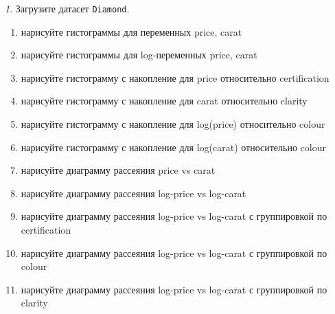 \documentclass[12pt]{article}
\theoremstyle{remark}
\newtheorem{exercise}{}[section]
\begin{document}
\begin{exercise}
Загрузите датасет \texttt{Diamond}.
\begin{enumerate}
	\item нарисуйте гистограммы для переменных price, carat
	\item нарисуйте гистограммы для log-переменных price, carat
	\item нарисуйте гистограмму с накопление для price относительно certification
	\item нарисуйте гистограмму с накопление для carat относительно clarity 
	\item нарисуйте гистограмму с накопление для log(price) относительно colour
	\item нарисуйте гистограмму с накопление для log(carat) относительно colour
	\item нарисуйте диаграмму рассеяния price vs carat
	\item нарисуйте диаграмму рассеяния log-price vs log-carat
	\item нарисуйте диаграмму рассеяния log-price vs log-carat с группировкой по certification
	\item нарисуйте диаграмму рассеяния log-price vs log-carat с группировкой по colour
	\item нарисуйте диаграмму рассеяния log-price vs log-carat с группировкой по clarity
\end{enumerate}
\end{exercise}
\end{document}
